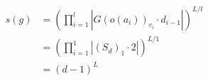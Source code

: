 \documentclass[preview]{standalone}
\begin{document}
\begin{align*}
s(g) &= \left(\prod_{i=1}^{l}\left|G(o(a_i))_{c_i}\cdot d_{i-1}\right|\right)^{L/l} \\   &= \left(\prod_{i=1}^{1}\left|\left(S_d\right)_{1}\cdot 2\right|\right)^{L/1} \\   &= (d-1)^{L}
\end{align*}
\end{document}
